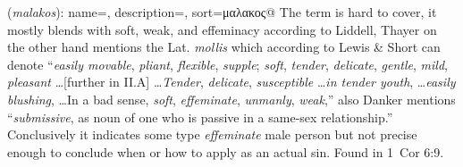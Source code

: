 \item[Catamite (inconclusive),]

(\textit{malakos}):
{
    name=,
    description={},
    sort=μαλακος@
}
The term is hard to cover, it mostly blends with soft, weak, and effeminacy according to Liddell, Thayer on the other hand mentions the Lat. \emph{mollis} which according to Lewis \& Short can denote ``\emph{easily movable}, \emph{pliant}, \emph{flexible}, \emph{supple}; \emph{soft}, \emph{tender}, \emph{delicate}, \emph{gentle}, \emph{mild}, \emph{pleasant} \ldots [further in II.A] \ldots \emph{Tender}, \emph{delicate}, \emph{susceptible} \ldots \emph{in tender youth}, \ldots \emph{easily blushing}, \ldots In a bad sense, \emph{soft}, \emph{effeminate}, \emph{unmanly}, \emph{weak},'' also Danker mentions ``\emph{submissive}, as noun of one who is passive in a same-sex relationship.'' Conclusively it indicates some type \emph{effeminate} male person but not precise enough to conclude when or how to apply as an actual sin.
Found in 1~Cor 6:9.
